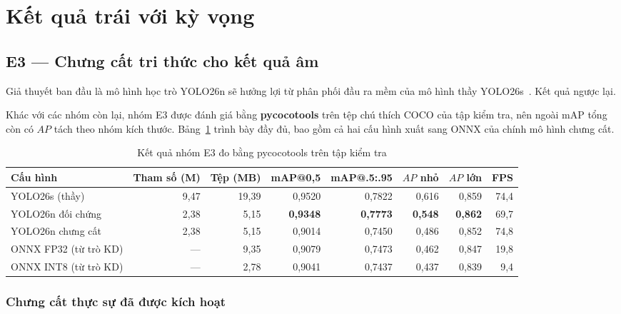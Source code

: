
\section{Kết quả trái với kỳ vọng}
\label{sec:trai_ky_vong}

\subsection{E3 --- Chưng cất tri thức cho kết quả âm}

Giả thuyết ban đầu là mô hình học trò YOLO26n sẽ hưởng lợi từ phân phối đầu ra mềm của mô hình
thầy YOLO26s~\cite{hinton2015distillation}. Kết quả ngược lại.

Khác với các nhóm còn lại, nhóm E3 được đánh giá bằng \textbf{pycocotools} trên tệp chú thích COCO
của tập kiểm tra, nên ngoài mAP tổng còn có $AP$ tách theo nhóm kích thước. Bảng~\ref{tab:e3} trình
bày đầy đủ, bao gồm cả hai cấu hình xuất sang ONNX của chính mô hình chưng cất.

\begin{table}[H]
\centering
\caption{Kết quả nhóm E3 đo bằng pycocotools trên tập kiểm tra}
\label{tab:e3}
\footnotesize
\begin{tabular}{lrrrrrrr}
\toprule
\textbf{Cấu hình} & \textbf{Tham số (M)} & \textbf{Tệp (MB)} & \textbf{mAP@0,5} & \textbf{mAP@.5:.95} & \textbf{$AP$ nhỏ} & \textbf{$AP$ lớn} & \textbf{FPS} \\
\midrule
YOLO26s (thầy)        & 9,47 & 19,39 & 0,9520 & 0,7822 & 0,616 & 0,859 & 74,4 \\
YOLO26n đối chứng     & 2,38 & 5,15  & \textbf{0,9348} & \textbf{0,7773} & \textbf{0,548} & \textbf{0,862} & 69,7 \\
YOLO26n chưng cất     & 2,38 & 5,15  & 0,9014 & 0,7450 & 0,486 & 0,852 & 74,8 \\
\midrule
ONNX FP32 (từ trò KD) & ---  & 9,35  & 0,9079 & 0,7473 & 0,462 & 0,847 & 19,8 \\
ONNX INT8 (từ trò KD) & ---  & 2,78  & 0,9041 & 0,7437 & 0,437 & 0,839 & 9,4 \\
\bottomrule
\end{tabular}
\end{table}

\subsubsection*{Chưng cất thực sự đã được kích hoạt}

